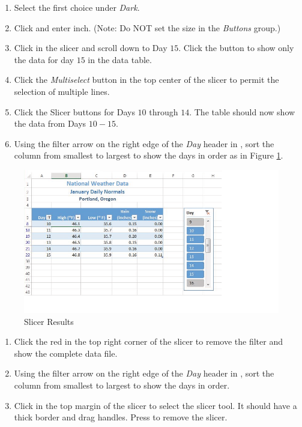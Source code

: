 \begin{enumerate}
	\item Select the first choice under \textit{Dark}.
	\item Click  and enter  inch. (Note: Do NOT set the size in the \textit{Buttons} group.)
	\item Click in the slicer and scroll down to Day $ 15 $. Click the  button to show only the data for day $ 15 $ in the data table.
	\item Click the \textit{Multiselect} button in the top center of the slicer to permit the selection of multiple lines.
	\item Click the Slicer buttons for Days $ 10 $ through $ 14 $. The table should now show the data from Days $ 10-15 $.
	\item Using the filter arrow on the right edge of the \textit{Day} header in , sort the column from smallest to largest to show the days in order as in Figure \ref{05:fig21}.
\end{enumerate}

\begin{figure}[H]
	\centering
	\includegraphics[width=\maxwidth{.95\linewidth}]{gfx/ch05_fig21}
	\caption{Slicer Results}
	\label{05:fig21}
\end{figure}

\begin{enumerate}[resume]
	\item Click the red  in the top right corner of the slicer to remove the filter and show the complete data file.
	\item Using the filter arrow on the right edge of the \textit{Day} header in , sort the column from smallest to largest to show the days in order.
	\item Click in the top margin of the slicer to select the slicer tool. It should have a thick border and drag handles. Press  to remove the slicer.
 \end{enumerate}

